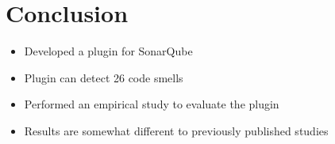 \documentclass{beamer}
\begin{document}
    \section{Conclusion}\label{sec:conclusion}
    \begin{frame}{\secname}
        \begin{itemize}
            \item Developed a plugin for SonarQube
            \item Plugin can detect 26 code smells
            \item Performed an empirical study to evaluate the plugin
            \item Results are somewhat different to previously published studies
        \end{itemize}
    \end{frame}
\end{document}
